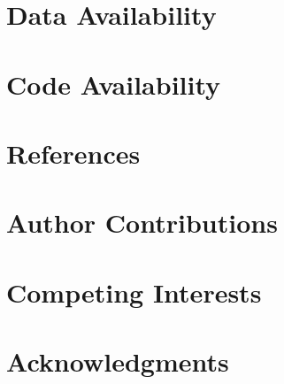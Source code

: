 \documentclass{article}
\begin{document}
\section{Data Availability}
\section{Code Availability}
\section{References}
\section{Author Contributions}
\section{Competing Interests}
\section{Acknowledgments}
\end{document}
